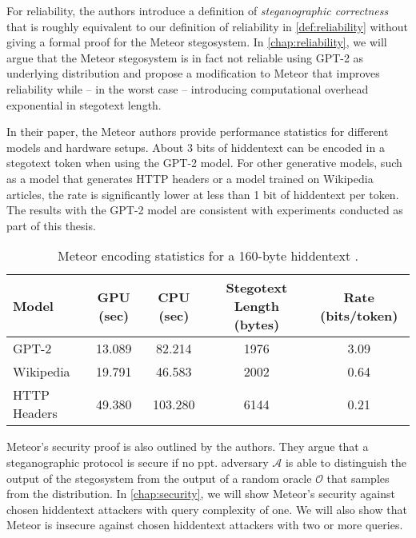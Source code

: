 For reliability, the authors introduce a definition of \emph{steganographic correctness} that is roughly equivalent to our definition of reliability in \autoref{def:reliability} without giving a formal proof for the Meteor stegosystem.
In \autoref{chap:reliability}, we will argue that the Meteor stegosystem is in fact not reliable using GPT-2 as underlying distribution and propose a modification to Meteor that improves reliability while -- in the worst case -- introducing computational overhead exponential in stegotext length.

In their paper, the Meteor authors provide performance statistics for different models and hardware setups.
About 3 bits of hiddentext can be encoded in a stegotext token when using the GPT-2 model.
For other generative models, such as a model that generates HTTP headers or a model trained on Wikipedia articles, the rate is significantly lower at less than 1 bit of hiddentext per token.
The results with the GPT-2 model are consistent with experiments conducted as part of this thesis.

\begin{table}[h!]
  \begin{tabular}{l||c|c|c|c}
    Model & GPU (sec) & CPU (sec) & Stegotext Length (bytes) & Rate (bits/token) \\
    \hline
    GPT-2        & 13.089 & 82.214  & 1976 & 3.09 \\
    Wikipedia    & 19.791 & 46.583  & 2002 & 0.64 \\
    HTTP Headers & 49.380 & 103.280 & 6144 & 0.21 \\
  \end{tabular}
  \caption{Meteor encoding statistics for a 160-byte hiddentext \cite{Meteor2021}.}
\end{table}

Meteor's security proof is also outlined by the authors.
They argue that a steganographic protocol is secure if no ppt. adversary $\mathcal{A}$ is able to distinguish the output of the stegosystem from the output of a random oracle $\mathcal{O}$ that samples from the distribution.
In \autoref{chap:security}, we will show Meteor's security against chosen hiddentext attackers with query complexity of one.
We will also show that Meteor is insecure against chosen hiddentext attackers with two or more queries.
